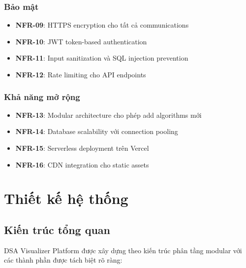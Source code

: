 \documentclass[12pt,a4paper]{article}
\begin{document}
\subsubsection{Bảo mật}
\begin{itemize}
    \item \textbf{NFR-09}: HTTPS encryption cho tất cả communications
    \item \textbf{NFR-10}: JWT token-based authentication
    \item \textbf{NFR-11}: Input sanitization và SQL injection prevention
    \item \textbf{NFR-12}: Rate limiting cho API endpoints
\end{itemize}

\subsubsection{Khả năng mở rộng}
\begin{itemize}
    \item \textbf{NFR-13}: Modular architecture cho phép add algorithms mới
    \item \textbf{NFR-14}: Database scalability với connection pooling
    \item \textbf{NFR-15}: Serverless deployment trên Vercel
    \item \textbf{NFR-16}: CDN integration cho static assets
\end{itemize}

\section{Thiết kế hệ thống}

\subsection{Kiến trúc tổng quan}

DSA Visualizer Platform được xây dựng theo kiến trúc phân tầng modular với các thành phần được tách biệt rõ ràng:
\end{document}
